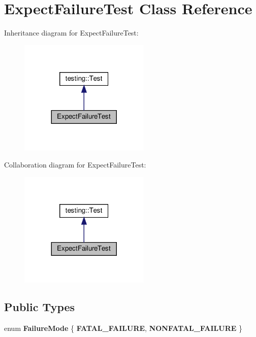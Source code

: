 \hypertarget{class_expect_failure_test}{}\section{Expect\+Failure\+Test Class Reference}
\label{class_expect_failure_test}


Inheritance diagram for Expect\+Failure\+Test\+:
\nopagebreak
\begin{figure}[H]
\begin{center}
\leavevmode
\includegraphics[width=176pt]{class_expect_failure_test__inherit__graph}
\end{center}
\end{figure}


Collaboration diagram for Expect\+Failure\+Test\+:
\nopagebreak
\begin{figure}[H]
\begin{center}
\leavevmode
\includegraphics[width=176pt]{class_expect_failure_test__coll__graph}
\end{center}
\end{figure}
\subsection*{Public Types}
\begin{DoxyCompactItemize}
\item 
\mbox{\label{class_expect_failure_test_aad05da10bb15d21a434eba3b37011406}} 
enum {\bfseries Failure\+Mode} \{ {\bfseries F\+A\+T\+A\+L\+\_\+\+F\+A\+I\+L\+U\+RE}, 
{\bfseries N\+O\+N\+F\+A\+T\+A\+L\+\_\+\+F\+A\+I\+L\+U\+RE}
 \}
\end{DoxyCompactItemize}
